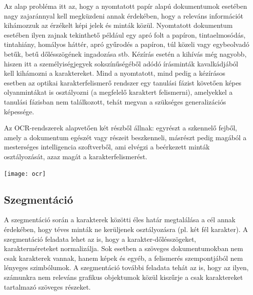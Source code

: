 Az alap probléma itt az, hogy a nyomtatott papír alapú dokumentumok esetében nagy zajaránnyal kell megküzdeni annak érdekében, hogy a releváns információt kihámozzuk az érzékelt képi jelek és minták közül. Nyomtatott dokumentum esetében ilyen zajnak tekinthető például egy apró folt a papíron, tintaelmosódás, tintahiány, homályos háttér, apró gyűrodés a papíron, túl közeli vagy egybeolvadó betűk, betű dőlésszögének ingadozása stb. Kézírás esetén a kihívás még nagyobb, hiszen itt a személyiségjegyek sokszínűségéből adódó írásminták kavalkádjából kell kihámozni a karaktereket. Mind a nyomtatott, mind pedig a kézírásos esetben az optikai karakterfelismerő rendszer egy tanulási fázist követően képes olyanmintákat is osztályozni (a megfelelő karaktert felismerni), amelyekkel a tanulási fázisban nem találkozott, tehát megvan a szükséges generalizációs képessége.

Az OCR-rendszerek alapvetően két részből állnak: egyrészt a szkennelő fejből, amely a dokumentum egészét vagy részeit beszkenneli, másrészt pedig magából a mesterséges intelligencia szoftverből, ami elvégzi a beérkezett minták osztályozását, azaz magát a karakterfelismerést.

\begin{center}
\texttt{[image: ocr]}
\end{center}

\subsection{Szegmentáció}

A szegmentáció során a karakterek közötti éles határ megtalálása a cél annak érdekében, hogy téves minták ne kerüljenek osztályozásra (pl. két fél karakter). A szegmentáció feladata lehet az is, hogy a karakter-dőlésszögeket, karakterméreteket normalizálja. Sok esetben a szöveges dokumentumokban nem csak karakterek vannak, hanem képek és egyéb, a felismerés szempontjából nem lényeges szimbólumok. A szegmentáció további feladata tehát az is, hogy az ilyen, számunkra nem releváns grafikus objektumok közül kiszűrje a csak karaktereket tartalmazó szöveges részeket.

